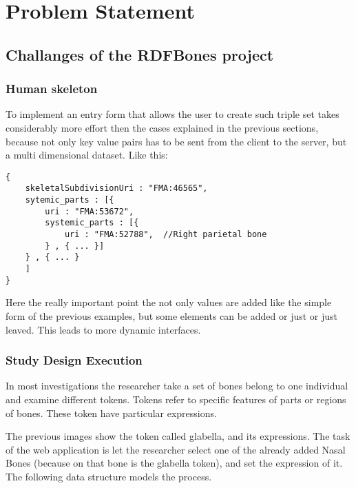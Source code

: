 \chapter{Problem Statement}

\section{Challanges of the RDFBones project}

\subsection{Human skeleton}




To implement an entry form that allows the user to create such triple set takes considerably more effort then the cases explained in the previous sections, because not only key value pairs has  to be sent from the client to the server, but a multi dimensional dataset. Like this: 


\begin{lstlisting}[captionpos=b, caption=Form data representing skull, label=skullJSON,
basicstyle=\footnotesize,frame=single]
{
	skeletalSubdivisionUri : "FMA:46565",
	sytemic_parts : [{
		uri : "FMA:53672",
		systemic_parts : [{
			uri : "FMA:52788",  //Right parietal bone
		} , { ... }]
	} , { ... }
	]	
}
\end{lstlisting}


Here the really important point the not only values are added like the simple form of the previous examples, but some elements can be added or just or just leaved. This leads to more dynamic
interfaces.

\subsection{Study Design Execution}




In most investigations the researcher take a set of bones belong to one individual and examine different tokens. Tokens refer to specific features of parts or regions of bones. These token have particular expressions.


The previous images show the token called glabella, and its expressions. The task of the web application is let the researcher select one of the already added Nasal Bones (because on that bone is the glabella token), and set the expression of it. The following data structure models the process.

